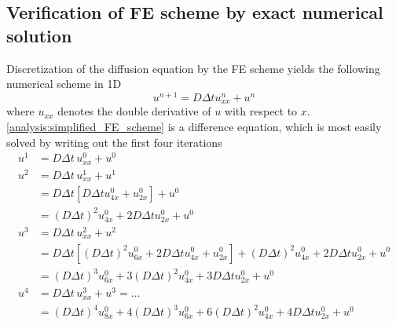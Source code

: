 \subsection{Verification of FE scheme by exact numerical solution}\label{exact_numerical_solution}

Discretization of the diffusion equation by the FE scheme yields the following numerical scheme in 1D
\begin{equation}\label{analysis:simplified_FE_scheme}
 u^{n+1} = D\Delta t u^n_{xx} + u^n
\end{equation}
where $u_{xx}$ denotes the double derivative of $u$ with respect to $x$. 
\eqref{analysis:simplified_FE_scheme} is a difference equation, which is most easily solved by writing out the first four iterations
\begin{align*}
 u^1 &= D\Delta t\, u_{xx}^0 + u^0 \\
 u^2 &= D\Delta t\, u_{xx}^1 + u^1 \\
 &= D\Delta t\left[D\Delta t u_{4x}^0 + u_{2x}^0\right] + u^0\\
 &= \left(D\Delta t\right)^2 u_{4x}^0 + 2D\Delta t u_{2x}^0+ u^0 \\
 u^3 &= D\Delta t\, u_{xx}^2 + u^2 \\
 &= D\Delta t\left[\left(D\Delta t\right)^2 u_{6x}^0 + 2D\Delta t u_{4x}^0+ u_{2x}^0\right] + \left(D\Delta t\right)^2 u_{4x}^0 + 2D\Delta t u_{2x}^0+ u^0\\
 &= \left(D\Delta t\right)^3 u_{6x}^0 + 3\left(D\Delta t\right)^2 u_{4x}^0+ 3D\Delta tu_{2x}^0 + u^0 \\
 u^4 &= D\Delta t \,u_{xx}^3 + u^3 = \dots \\
 &= \left(D\Delta t\right)^4 u_{8x}^0 + 4\left(D\Delta t\right)^3 u_{6x}^0+ 6\left(D\Delta t\right)^2 u_{4x}^0 + 4D\Delta t u_{2x}^0 + u^0 
\end{align*}

